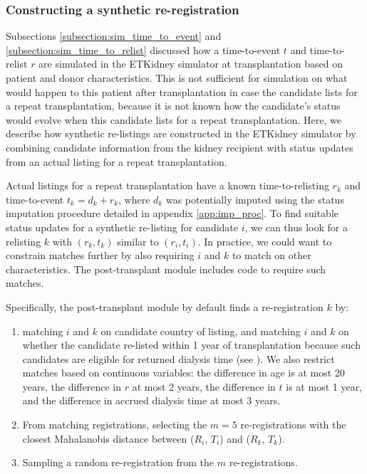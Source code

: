 \subsubsection{Constructing a synthetic re-registration}
\label{subsection:synth_registrations}
Subsections \ref{subsection:sim_time_to_event} and \ref{subsection:sim_time_to_relist} discussed how a time-to-event $t$ and time-to-relist $r$ are simulated in the ETKidney simulator at transplantation based on patient and donor characteristics. This is not sufficient for simulation on what would happen to this patient after transplantation in case the candidate lists for a repeat transplantation, because it is not known how the candidate's status would evolve when this candidate lists for a repeat transplantation. Here, we describe how synthetic re-listings are constructed in the ETKidney simulator by combining candidate information from the kidney recipient with status updates from an actual listing for a repeat transplantation.
\par 
Actual listings for a repeat transplantation have a known time-to-relisting $r_k$ and time-to-event $t_k = d_k + r_k$, where $d_k$ was potentially imputed using the status imputation procedure detailed in appendix \ref{app:imp_proc}. To find suitable status updates for a synthetic re-listing for candidate $i$, we can thus look for a relisting $k$ with $(r_k, t_k)$ similar to $(r_i, t_i)$. In practice, we could want to constrain matches further by also requiring $i$ and $k$ to match on other characteristics. The post-transplant module includes code to require such matches.
\par
Specifically, the post-transplant module by default finds a re-registration $k$ by:
\begin{enumerate}[noitemsep]
	\item matching $i$ and $k$ on candidate country of listing, and matching $i$ and $k$ on whether the candidate re-listed within 1 year of transplantation because such candidates are eligible for returned dialysis time (see \cite{manualKidney}). We also restrict matches based on continuous variables: the difference in age is at most 20 years, the difference in $r$ at most 2 years, the difference in $t$ is at most 1 year, and the difference in accrued dialysis time at most 3 years.	
	\item From matching registrations, selecting the $m=5$ re-registrations with the closest Mahalanobis distance between ($R_i$, $T_i$) and ($R_k$, $T_k$). 
	\item Sampling a random re-registration from the $m$ re-registrations.
\end{enumerate}
